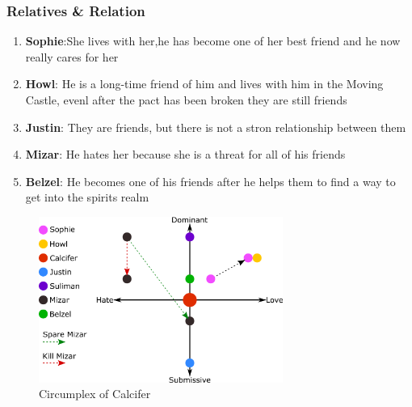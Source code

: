 
\subsubsection*{Relatives \& Relation}
\begin{enumerate}
\item \textbf{Sophie}:She lives with her,he has become one of her best friend and he now really cares for her
\item \textbf{Howl}: He is a long-time friend of him and lives with him in the Moving Castle, evenl after the pact has been broken they are still friends
\item \textbf{Justin}: They are friends, but there is not a stron relationship between them
\item \textbf{Mizar}: He hates her because she is a threat for all of his friends
\item \textbf{Belzel}: He becomes one of his friends after he helps them to find a way to get into the spirits realm
\end{enumerate}

\begin{figure}[H]
  \centering
  \includegraphics[width=8cm]{Images/Circumplexes/calciferCircumplex}
  \caption{Circumplex of Calcifer}
\end{figure}

